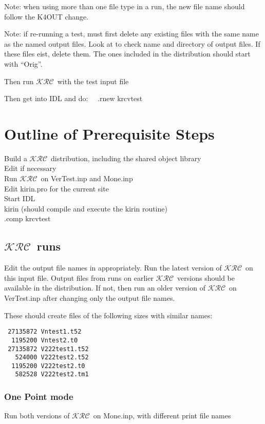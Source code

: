 \documentclass{article}  %
\newcommand{\krc}{$\mathcal{KRC}$~}    %
\begin{document}
Note: when using more than one file type in a run, the new file name should follow the K4OUT change.

Note: if re-running a test, must first delete any existing files with the same name as the  named output files. Look at  to check name and directory of output files. If these files eist, delete them. The ones included in the distribution should start with ``Orig''. 

Then run \krc with the test input file

Then get into IDL and do: \ \  .rnew krcvtest


\section{Outline of Prerequisite Steps} %
Build a \krc distribution, including the shared object library
\\ Edit  if necessary
\\ Run \krc on VerTest.inp and Mone.inp
\\ Edit kirin.pro for the current site
\\ Start IDL
\\ kirin  (should compile and execute the kirin routine)
\\ .comp krcvtest

\subsection{\krc runs}
Edit the output file names in    appropriately. Run the latest version of \krc on this input file.
\qi Output files from runs on earlier \krc versions should be available in the distribution.  If not, then run an older version of \krc  on VerTest.inp after changing only the output file names.

These should create files of the following sizes with similar names:
\vspace{-3.mm} 
\begin{verbatim}
 27135872 Vntest1.t52
  1195200 Vntest2.t0
 27135872 V222test1.t52
   524000 V222test2.t52
  1195200 V222test2.t0
   582528 V222test2.tm1
\end{verbatim}

\subsubsection{One Point mode} %

Run both versions of \krc on Mone.inp, with different print file names
\end{document}
